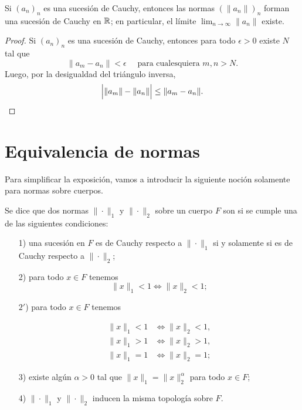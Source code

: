 \documentclass{article}
\numberwithin{equation}{section}
\theoremstyle{definition}
\begin{document}
\begin{observacion}
  \label{obs:sucesion-de-Cauchy-sucesion-de-normas}
  Si $(a_n)_n$ es una sucesión de Cauchy, entonces las normas $(\|a_n\|)_n$
  forman una sucesión de Cauchy en $\mathbb{R}$; en particular, el límite
  $\lim_{n\to\infty} \|a_n\|$ existe.

  \begin{proof}
    Si $(a_n)_n$ es una sucesión de Cauchy, entonces para todo $\epsilon > 0$
    existe $N$ tal que
    $$\|a_m - a_n\| < \epsilon\quad\text{ para cualesquiera }m,n > N.$$
    Luego, por la desigualdad del triángulo inversa,
    \[ \Bigl|\|a_m\|-\|a_n\|\Bigr| \le \|a_m-a_n\|. \qedhere \]
  \end{proof}
\end{observacion}


\section{Equivalencia de normas}

Para simplificar la exposición, vamos a introducir la siguiente noción solamente
para normas sobre cuerpos.

\begin{definicion}
  \label{dfn:normas-equivalentes}
  Se dice que dos normas $\|\cdot\|_1$ y $\|\cdot\|_2$ sobre un cuerpo $F$ son
   si se cumple una de las siguientes condiciones:

  \begin{enumerate}
  \item[1)] una sucesión en $F$ es de Cauchy respecto a $\|\cdot\|_1$
    si y solamente si es de Cauchy respecto a $\|\cdot\|_2$;

  \item[2)] para todo $x\in F$ tenemos
    $$\|x\|_1 < 1 \iff \|x\|_2 < 1;$$

  \item[$2'$)] para todo $x\in F$ tenemos

    \begin{align}
      \label{eqn:normas-equivalentes-<>1-1} \|x\|_1 < 1 & \iff \|x\|_2 < 1,\\
      \label{eqn:normas-equivalentes-<>1-2} \|x\|_1 > 1 & \iff \|x\|_2 > 1,\\
      \label{eqn:normas-equivalentes-<>1-3} \|x\|_1 = 1 & \iff \|x\|_2 = 1;
    \end{align}

  \item[3)] existe algún $\alpha > 0$ tal que $\|x\|_1 = \|x\|_2^\alpha$ para
    todo $x\in F$;

  \item[4)] $\|\cdot\|_1$ y $\|\cdot\|_2$ inducen la misma topología sobre $F$.
  \end{enumerate}
\end{definicion}
\end{document}

